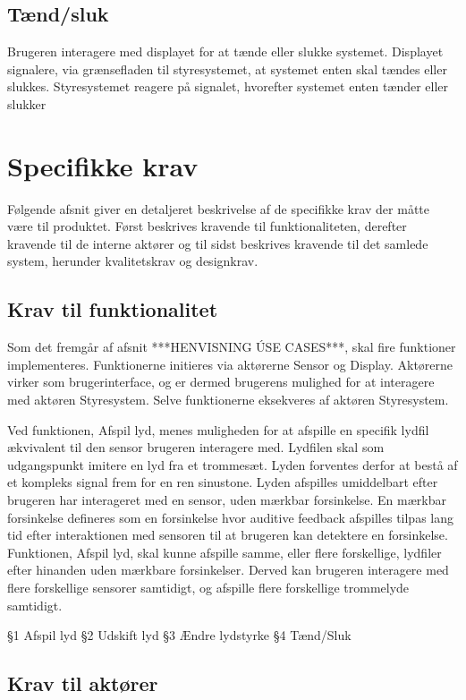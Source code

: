 \subsection{Tænd/sluk}
Brugeren interagere med displayet for at tænde eller slukke systemet. Displayet signalere, via grænsefladen til styresystemet, at systemet enten skal tændes eller slukkes. Styresystemet reagere på signalet, hvorefter systemet enten tænder eller slukker

\section{Specifikke krav}
Følgende afsnit giver en detaljeret beskrivelse af de specifikke krav der måtte være til produktet. Først beskrives kravende til funktionaliteten, derefter kravende til de interne aktører og til sidst beskrives kravende til det samlede system, herunder kvalitetskrav og designkrav. 

\subsection{Krav til funktionalitet}
Som det fremgår af afsnit ***HENVISNING ÚSE CASES***, skal fire funktioner implementeres. Funktionerne initieres via aktørerne Sensor og Display. Aktørerne virker som brugerinterface, og er dermed brugerens mulighed for at interagere med aktøren Styresystem. Selve funktionerne eksekveres af aktøren Styresystem.

Ved funktionen, Afspil lyd, menes muligheden for at afspille en specifik lydfil ækvivalent til den sensor brugeren interagere med. Lydfilen skal som udgangspunkt imitere en lyd fra et trommesæt. Lyden forventes derfor at bestå af et kompleks signal frem for en ren sinustone. Lyden afspilles umiddelbart efter brugeren har interageret med en sensor, uden mærkbar forsinkelse. En mærkbar forsinkelse defineres som en forsinkelse hvor auditive feedback afspilles tilpas lang tid efter interaktionen med sensoren til at brugeren kan detektere en forsinkelse. Funktionen, Afspil lyd, skal kunne afspille samme, eller flere forskellige, lydfiler efter hinanden uden mærkbare forsinkelser. Derved kan brugeren interagere med flere forskellige sensorer samtidigt, og afspille flere forskellige trommelyde samtidigt.     
        
        

§1 Afspil lyd
§2 Udskift lyd
§3 Ændre lydstyrke
§4 Tænd/Sluk

\subsection{Krav til aktører}

